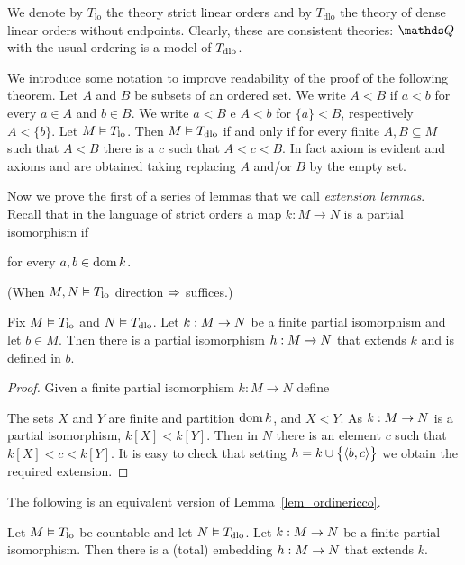 \documentclass[creche.tex]{subfiles}
\begin{document}
We denote by \emph{$T_{\textrm{lo}}$} the theory strict linear orders and by \emph{$T_{\textrm{dlo}}$} the theory of dense linear orders without endpoints. Clearly, these are consistent theories: $\QQ$ with the usual ordering is a model of $T_{\rm dlo}$.

We introduce some notation to improve readability of the proof of the following theorem. Let $A$ and $B$ be subsets of an ordered set. We write $A<B$ if $a<b$ for every $a\in A$ and $b\in B$. We write $a<B$ e $A<b$ for $\{a\}<B$, respectively $A<\{b\}$. Let $M\models T_{\rm lo}$. Then $M\models T_{\rm dlo}$ if and only if for every finite $A, B\subseteq M$ such that $A<B$ there is a $c$ such that  $A<c<B$.  In fact axiom  is evident and axioms  and  are obtained taking replacing $A$ and/or $B$ by the empty set.

Now we prove the first of a series of lemmas that we call \emph{extension lemmas}. Recall that in the language of strict orders a map $k:M\to N$ is a partial isomorphism if

\hfill for every $a,b\in\dom k$.

(When $M,N\models T_{\rm lo}$ direction $\IMP$ suffices.)

\begin{lemma}\label{lem_ordinericco}
Fix $M\models T_{\rm lo}$ and $N\models T_{\rm dlo}$. Let $k:M\imp N$ be a finite partial isomorphism and let $b\in M$. Then there is a partial isomorphism $h:M\imp N$ that extends $k$ and is defined in $b$.
\end{lemma}

\begin{proof}
Given a finite partial isomorphism $k:M\to N$ define



The sets $X$ and $Y$ are finite and partition $\dom k$, and  $X<Y$. As $k:M\imp N$ is a partial isomorphism, $k[X]<k[Y]$. Then in $N$ there is an element $c$ such that $k[X]<c<k[Y]$. It is easy to check that setting $h=k\cup\big\{\<b,c\>\big\}$ we obtain the required extension.
\end{proof}

The following is an equivalent version of Lemma~\ref{lem_ordinericco}.

\begin{corollary}\label{coroll_ordinericco}
Let $M\models T_{\rm lo}$ be countable and let $N\models T_{\rm dlo}$. Let $k:M\imp N$ be a finite partial isomorphism. Then there is a (total) embedding $h:M\imp N$ that extends $k$.
\end{corollary}
\end{document}
